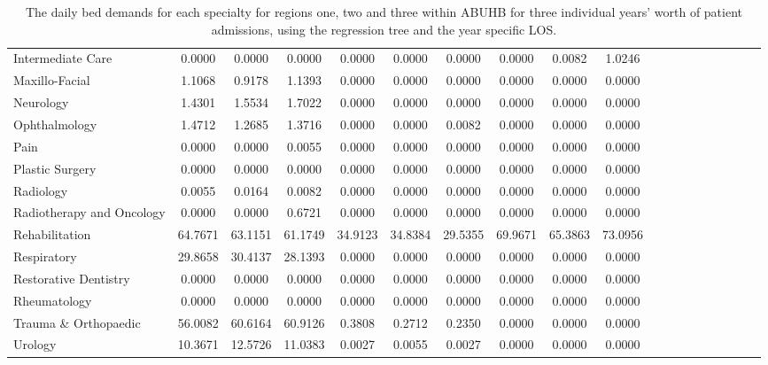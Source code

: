 \documentclass[thesis.tex]{subfiles}
\begin{document}
\begin{landscape}
\begin{table}[h!]
{\begin{tabular}{lcccccccccccccccccc}
Intermediate Care&	0.0000&	0.0000&	0.0000&	0.0000&	0.0000&	0.0000&	0.0000&	0.0082&	1.0246\\
Maxillo-Facial&	1.1068&	0.9178&	1.1393&	0.0000&	0.0000&	0.0000&	0.0000&	0.0000&	0.0000\\
Neurology	&1.4301&	1.5534&	1.7022&	0.0000&	0.0000&	0.0000&	0.0000&	0.0000&	0.0000\\
Ophthalmology	&1.4712&	1.2685&	1.3716&	0.0000&	0.0000&	0.0082&	0.0000&	0.0000&	0.0000\\
Pain	&0.0000&	0.0000&	0.0055&	0.0000&	0.0000&	0.0000&	0.0000&	0.0000&	0.0000\\
Plastic Surgery&	0.0000&	0.0000&	0.0000&	0.0000&	0.0000&	0.0000&	0.0000&	0.0000&	0.0000\\
Radiology	&0.0055&	0.0164&	0.0082&	0.0000&	0.0000&	0.0000&	0.0000&	0.0000&	0.0000\\
Radiotherapy and Oncology&	0.0000&	0.0000&	0.6721&	0.0000&	0.0000&	0.0000&	0.0000&	0.0000&	0.0000\\
Rehabilitation	&64.7671&	63.1151&	61.1749&	34.9123&	34.8384&	29.5355&	69.9671&	65.3863&	73.0956\\
Respiratory	&29.8658&	30.4137&	28.1393&	0.0000&	0.0000&	0.0000&	0.0000&	0.0000&	0.0000\\
Restorative Dentistry&	0.0000&	0.0000&	0.0000&	0.0000&	0.0000&	0.0000&	0.0000&	0.0000&	0.0000\\
Rheumatology	&0.0000&	0.0000&	0.0000&	0.0000&	0.0000&	0.0000&	0.0000&	0.0000&	0.0000\\
Trauma \& Orthopaedic&	56.0082&	60.6164&	60.9126&	0.3808&	0.2712&	0.2350&	0.0000&	0.0000&	0.0000\\
Urology	&10.3671&	12.5726&	11.0383&	0.0027&	0.0055&	0.0027&	0.0000&	0.0000&	0.0000\\

\bottomrule
\end{tabular}  } 
\caption{The daily bed demands for each specialty for regions one, two and three within ABUHB for three individual years’ worth of patient admissions, using the regression tree and the year specific LOS.}
    \label{apptab:LinkedDemands5a}
\end{table}


\end{landscape}
\end{document}
